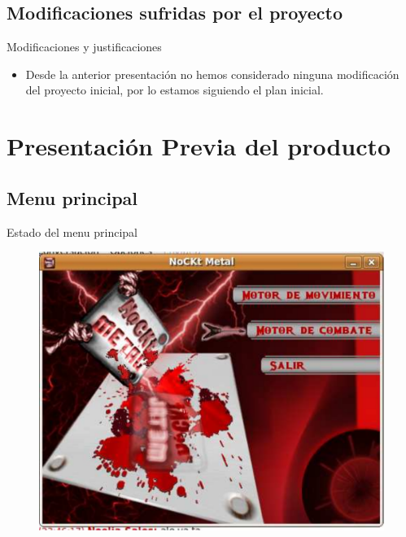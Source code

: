 \documentclass[9pt,xcolor=svgnames]{beamer}
\begin{document}
   
   
   \subsection{Modificaciones sufridas por el proyecto}
   
   \begin{frame}{Modificaciones y justificaciones}
    
    \begin{itemize}
     \item Desde la anterior presentación no hemos considerado
	   ninguna modificación del proyecto inicial, por lo
	   estamos siguiendo el plan inicial.
	 
    \end{itemize}    
    
   \end{frame}
   
   
 \section{Presentación Previa del producto}

 \subsection{Menu principal}
 \begin{frame}{Estado del menu principal}
   \begin{figure}[t]
    \includegraphics[scale=0.35]{./Imagenes/menu.pdf}
   \end{figure}
 \end{frame}
 
\end{document}
